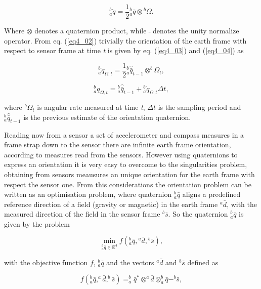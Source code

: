 \begin{equation}
\label{eq4_02}
^b_a\dot{q} = \frac{1}{2} {^b_a \bar{q}}  \otimes {^b\Omega}.
\end{equation}

\noindent Where $\otimes$ denotes a quaternion product, while $\bar{}$ denotes the unity normalize operator. From eq. (\ref{eq4_02}) trivially the orientation of the earth frame with respect to sensor frame at time \textit{t} is given by eq. (\ref{eq4_03}) and (\ref{eq4_04}) as

\begin{equation}
\label{eq4_03}
^b_a \dot{q}_{\Omega,t} = \frac{1}{2} {^b_a \hat{\bar{q}}_{t-1}} \otimes ^b \Omega_t,
\end{equation}

\begin{equation}
\label{eq4_04}
^b_a q_{\Omega,t} = {^b_a \hat{\bar{q}}_{t-1}} + {^b_a \dot{q}_{\Omega,t}} \Delta t,
\end{equation} 

\noindent where $^b \Omega_t$ is angular rate measured at time \textit{t}, $\Delta t$ is the sampling period and $^b_a \hat{\bar{q}}_{t-1}$ is the previous estimate of the orientation quaternion.

Reading now from a sensor a set of accelerometer and compass measures in a frame strap down to the sensor there are infinite earth frame orientation, according to measures read from the sensors. 
However using quaternions to express an orientation it is very easy to overcome to the singularities problem, obtaining from sensors meausures an unique orientation for the earth frame with respect the sensor one.
From this considerations the orientation problem can be written as an optimisation problem, where quaternion $^b_a \bar{q}$ aligns a predefined reference direction of a field (gravity or magnetic) in the earth frame $^a \bar{d}$, with the measured direction of the field in the sensor frame $^b \bar{s}$. So the quaternion $^b_a \bar{q}$ is given by the problem

\begin{equation}
\label{eq4_05}
\min_{{^b_a \bar{q}} \in \mathbb{R}^4} f({^b_a \bar{q}}, {^a \bar{d}}, {^b \bar{s}}),
\end{equation}

\noindent with the objective function $f$, $^b_a \bar{q}$ and the vectors $^a \bar{d}$ and $^b \bar{s}$ defined as 

\begin{equation}
\label{eq4_06}
f(^b_a \bar{q},^a \bar{d}, ^b \bar{s}) = ^b_a \bar{q}^{*} \otimes ^a \bar{d} \otimes ^b_a \bar{q} - ^b \bar{s}, 
\end{equation}

